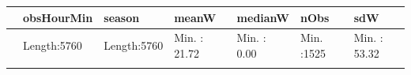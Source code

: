\documentclass[]{article}
\begin{document}
\begin{longtable}[]{@{}lllllll@{}}
\toprule
\begin{minipage}[b]{0.03\columnwidth}\raggedright\strut
\strut
\end{minipage} & \begin{minipage}[b]{0.14\columnwidth}\raggedright\strut
obsHourMin\strut
\end{minipage} & \begin{minipage}[b]{0.14\columnwidth}\raggedright\strut
season\strut
\end{minipage} & \begin{minipage}[b]{0.13\columnwidth}\raggedright\strut
meanW\strut
\end{minipage} & \begin{minipage}[b]{0.13\columnwidth}\raggedright\strut
medianW\strut
\end{minipage} & \begin{minipage}[b]{0.11\columnwidth}\raggedright\strut
nObs\strut
\end{minipage} & \begin{minipage}[b]{0.13\columnwidth}\raggedright\strut
sdW\strut
\end{minipage}\tabularnewline
\midrule
\endhead
\begin{minipage}[t]{0.03\columnwidth}\raggedright\strut
\strut
\end{minipage} & \begin{minipage}[t]{0.14\columnwidth}\raggedright\strut
Length:5760\strut
\end{minipage} & \begin{minipage}[t]{0.14\columnwidth}\raggedright\strut
Length:5760\strut
\end{minipage} & \begin{minipage}[t]{0.13\columnwidth}\raggedright\strut
Min. : 21.72\strut
\end{minipage} & \begin{minipage}[t]{0.13\columnwidth}\raggedright\strut
Min. : 0.00\strut
\end{minipage} & \begin{minipage}[t]{0.11\columnwidth}\raggedright\strut
Min. :1525\strut
\end{minipage} & \begin{minipage}[t]{0.13\columnwidth}\raggedright\strut
Min. : 53.32\strut
\end{minipage}\tabularnewline
\begin{minipage}[t]{0.03\columnwidth}\raggedright\strut
\strut
\end{minipage} & \begin{minipage}[t]{0.14\columnwidth}\raggedright\strut

\end{minipage}
\end{longtable}
\end{document}
